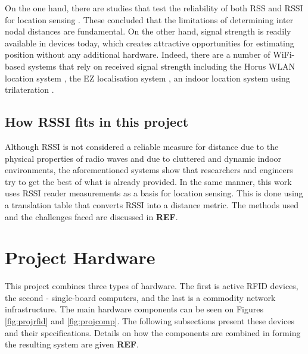 On the one hand, there are studies that test the reliability of both RSS and RSSI for location sensing \cite{Elnahrawy2004, Parameswaran2009}. These concluded that the limitations of determining inter nodal distances are fundamental. On the other hand, signal strength is readily available in devices today, which creates attractive opportunities for estimating position without any additional hardware. Indeed, there are a number of WiFi-based systems that rely on received signal strength including the Horus WLAN location system \cite{Youssef2005}, the EZ localisation system \cite{Chintalapudi2010}, an indoor location system using trilateration \cite{Cook2005}.

\subsection{How RSSI fits in this project}

Although RSSI is not considered a reliable measure for distance due to the physical properties of radio waves and due to cluttered and dynamic indoor environments, the aforementioned systems show that researchers and engineers try to get the best of what is already provided. In the same manner, this work uses RSSI reader measurements as a basis for location sensing. This is done using a translation table that converts RSSI into a distance metric. The methods used and the challenges faced are discussed in \textbf{REF}.

\section{Project Hardware}
\label{sec:projhard}

This project combines three types of hardware. The first is active RFID devices, the second - single-board computers, and the last is a commodity network infrastructure. The main hardware components can be seen on Figures \ref{fig:projrfid} and \ref{fig:projcomp}. The following subsections present these devices and their specifications. Details on how the components are combined in forming the resulting system are given \textbf{REF}. 

